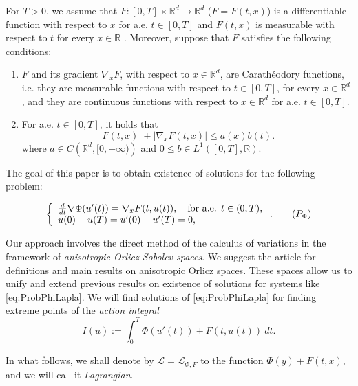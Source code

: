 \documentclass[twoside]{article}
\makeatletter
\theoremstyle{remark}
\newcommand{\labitem}[2]{%
\def\@itemlabel{#1}
\item
\def\@currentlabel{#1}\label{#2}}
\newcommand{\rr}{\mathbb{R}}
\renewcommand{\leq}{\leqslant}
\makeatother
\begin{document}
For $T>0$, we assume that  $F:[0,T]\times\rr^d\to\rr^d$  ($F=F(t,x)$)
  is a differentiable function  with respect to $x$ for a.e. $t\in [0,T]$ and $F(t,x)$ is measurable  with respect to $t$ for every $x\in\rr$ . Moreover, suppose that $F$ satisfies the following conditions:
\begin{enumerate}
\labitem{(C)}{item:condicion_c} $F$ and its gradient $\nabla_x F$, with respect to $x\in\rr^d$,  are  Carath\'eodory functions, i.e. they are measurable functions with respect to $t\in [0,T]$, for every  $x\in\rr^d$, and they are continuous functions with  respect to  $x\in\rr^d$ for a.e. $t \in [0,T]$.
 \labitem{(A)}{item:condicion_a}  For   a.e. $t\in [0,T]$, it holds that
\begin{equation}\label{eq:phi-lagrange}
|F(t,x)| + |\nabla_x F(t,x)|  \leq a(x)b(t).
\end{equation}
where  $a\in C\left(\rr^d,[0,+\infty)\right)$ and $0\leq b\in L^1([0,T],\rr)$.
\end{enumerate}


The goal of this paper is to obtain existence of solutions for  the following problem:

\begin{equation}\label{eq:ProbPhiLapla}
    \left\{%
\begin{array}{ll}
  \frac{d}{dt} \nabla \Phi(u'(t))= \nabla_{x}F(t,u(t)), \quad \hbox{for a.e. } t \in (0,T),\\
    u(0)-u(T)=u'(0)-u'(T)=0,
\end{array}%
\right. .\tag{${P_{\Phi}}$}
\end{equation}






Our approach involves the direct method of the calculus of variations in the framework of \emph{anisotropic Orlicz-Sobolev spaces}. 
We suggest the article  \cite{Orliczvectorial2005} for definitions and main results on anisotropic Orlicz spaces. These spaces allow us to unify and extend previous results on existence of solutions for systems like \eqref{eq:ProbPhiLapla}.
 We will find solutions of \eqref{eq:ProbPhiLapla} for finding extreme points of the \emph{action integral} 
\begin{equation}\label{eq:integral_accion}
  I(u):=\int_{0}^T \Phi(u'(t))+ F(t,u(t))\ dt.\tag{$IA$}
\end{equation}

In what follows, we shall denote by $\mathcal{L}=\mathcal{L}_{\Phi,F}$ to the function $\Phi(y)+F(t,x)$, and we will call it \emph{Lagrangian}. 
\end{document}
